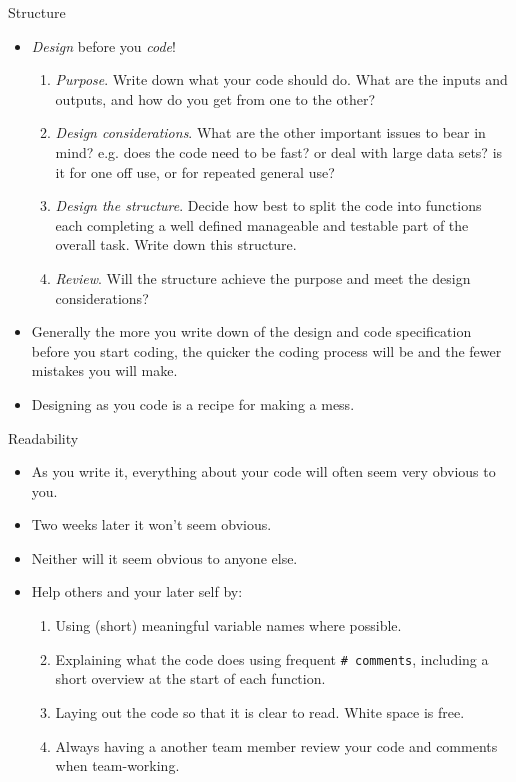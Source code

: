 \documentclass{beamer}
\begin{document}
\begin{frame}{Structure}
\begin{itemize}
\item {\em Design} before you {\em code}!
\begin{enumerate}
\item {\em Purpose}. Write down what your code should do. What are the inputs and outputs, and how do you get from one to the other?
\item {\em Design considerations}. What are the other important issues to bear in mind? e.g. does the code need to be fast? or deal with large data sets? is it for one off use, or for repeated general use?
\item {\em Design the structure}. Decide how best to split the code into functions each completing a well defined manageable and testable part of the overall task. Write down this structure. 
\item {\em Review}. Will the structure achieve the purpose and meet the design considerations?
\end{enumerate}
\item Generally the more you write down of the design and code specification before you start coding, the quicker the coding process will be and the fewer mistakes you will make. 
\item Designing as you code is a recipe for making a mess.
\end{itemize}
\end{frame}


\begin{frame}[fragile]{Readability}
\begin{itemize}
\item As you write it, everything about your code will often seem very obvious to you.
\item Two weeks later it won't seem obvious. 
\item Neither will it seem obvious to anyone else.
\item Help others and your later self by:
\begin{enumerate}
\item Using (short) meaningful variable names where possible.
\item Explaining what the code does using frequent \verb+# comments+, including a short overview at the start of each function.
\item Laying out the code so that it is clear to read. White space is free.
\item Always having a another team member review your code and comments when team-working.
\end{enumerate}
\end{itemize}
\end{frame}
\end{document}
